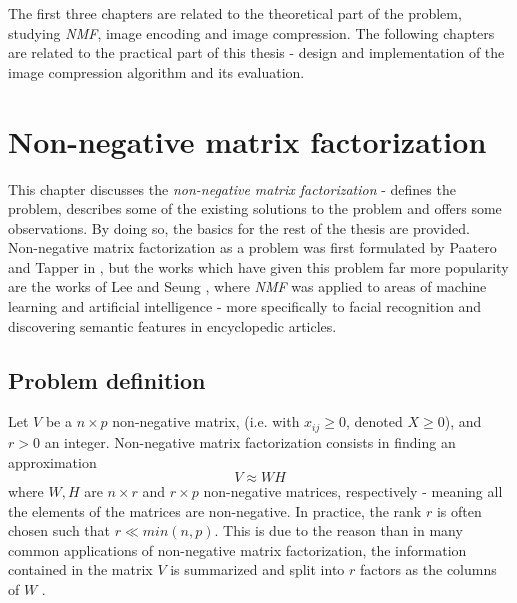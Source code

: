 \documentclass[thesis=M,english]{FITthesis}[2012/10/20]
\begin{document}
The first three chapters are related to the theoretical part of the problem, studying
\emph{NMF}, image encoding and image compression. The following chapters are related
to the practical part of this thesis - design and implementation of the image
compression algorithm and its evaluation.

%
\chapter{Non-negative matrix factorization}
\label{ch:NMF}
This chapter discusses the \emph{non-negative matrix factorization} - defines
the problem, describes some of the existing solutions to the problem and
offers some observations. By doing so, the basics for the rest of the thesis are
provided.
\\

Non-negative matrix factorization as a problem was first formulated by Paatero
and Tapper in \cite{nmf-paatero}, but the works which have given
this problem far more popularity are the works of Lee and Seung \cite{lee99}, where
\emph{NMF} was applied to areas of machine learning and artificial
intelligence - more specifically to facial recognition and discovering semantic
features in encyclopedic articles.

\section{Problem definition}
Let $V$ be a $n \times p$ non-negative matrix, (i.e. with $x_{ij} \geq 0$, denoted
$X \geq 0$), and $r > 0$ an integer. Non-negative matrix factorization consists in
finding an approximation
\begin{equation}
  V \approx WH
\end{equation}
where $W, H$ are $n \times r$ and $r \times p$ non-negative matrices, respectively - meaning
all the elements of the matrices are non-negative.
In practice, the rank $r$ is often chosen such that $r \ll min(n,p)$. This is due
to the reason than in many common applications of non-negative matrix factorization,
the information contained in the matrix $V$ is summarized and split into $r$ factors
as the columns of $W$ \cite{nmf-r-vignette}.
\\
\end{document}

